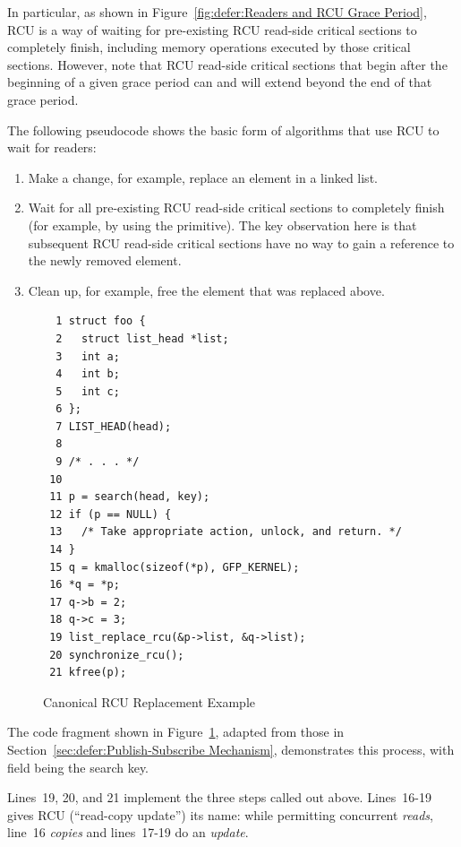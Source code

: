 In particular, as shown in
Figure~\ref{fig:defer:Readers and RCU Grace Period},
RCU is a way of
waiting for pre-existing RCU read-side critical sections to completely
finish, including memory operations executed by those critical sections.
However, note that RCU read-side critical sections
that begin after the beginning
of a given grace period can and will extend beyond the end of that grace
period.

The following pseudocode shows the basic form of algorithms that use
RCU to wait for readers:

\begin{enumerate}
\item	Make a change, for example, replace an element in a linked list.
\item	Wait for all pre-existing RCU read-side critical sections to
	completely finish (for example, by using the
	 primitive).
	The key observation here is that subsequent RCU read-side critical
	sections have no way to gain a reference to the newly removed
	element.
\item	Clean up, for example, free the element that was replaced above.
\end{enumerate}

\begin{figure}[tbp]
{ \scriptsize
\begin{verbatim}
  1 struct foo {
  2   struct list_head *list;
  3   int a;
  4   int b;
  5   int c;
  6 };
  7 LIST_HEAD(head);
  8
  9 /* . . . */
 10
 11 p = search(head, key);
 12 if (p == NULL) {
 13   /* Take appropriate action, unlock, and return. */
 14 }
 15 q = kmalloc(sizeof(*p), GFP_KERNEL);
 16 *q = *p;
 17 q->b = 2;
 18 q->c = 3;
 19 list_replace_rcu(&p->list, &q->list);
 20 synchronize_rcu();
 21 kfree(p);
\end{verbatim}
}
\caption{Canonical RCU Replacement Example}
\label{fig:defer:Canonical RCU Replacement Example}
\end{figure}

The code fragment shown in
Figure~\ref{fig:defer:Canonical RCU Replacement Example},
adapted from those in Section~\ref{sec:defer:Publish-Subscribe Mechanism},
demonstrates this process, with field  being the search key.

Lines~19, 20, and 21 implement the three steps called out above.
Lines~16-19 gives RCU (``read-copy update'') its name: while permitting
concurrent \emph{reads}, line~16 \emph{copies} and lines~17-19
do an \emph{update}.

